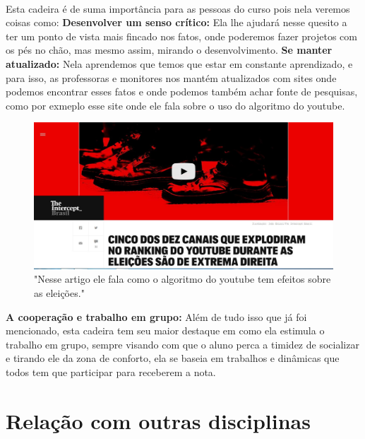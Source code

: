 \documentclass[10pt]{article}
\begin{document}
\paragraph{}Esta cadeira é de suma importância para as pessoas do curso pois nela veremos coisas como:\newline
\textbf{Desenvolver um senso crítico:} Ela lhe ajudará nesse quesito a ter um ponto de vista mais fincado nos fatos, onde poderemos fazer projetos com os pés no chão, mas mesmo assim, mirando o desenvolvimento.\newline\newpage
\textbf{Se manter atualizado:} Nela aprendemos que temos que estar em constante aprendizado, e para isso, as professoras e monitores nos mantém atualizados com sites onde podemos encontrar esses fatos e onde podemos também achar fonte de pesquisas, como por exmeplo esse site onde ele fala sobre o uso do algoritmo do youtube.\cite{Site}
\begin{figure}[!htb]
     \centering
     \includegraphics[scale=0.2]{Site.jpg}
     \caption{"Nesse artigo ele fala como o algoritmo do youtube tem efeitos sobre as eleições."}
     \label{fig:imagem1}
\end{figure}
\newline\textbf{A cooperação e trabalho em grupo:} Além de tudo isso que já foi mencionado, esta cadeira tem seu maior destaque em como ela estimula o trabalho em grupo, sempre visando com que o aluno perca a timidez de socializar e tirando ele da zona de conforto, ela se baseia em trabalhos e dinâmicas que todos tem que participar para receberem a nota.\cite{Site2}



\section{Relação com outras disciplinas}
\end{document}
